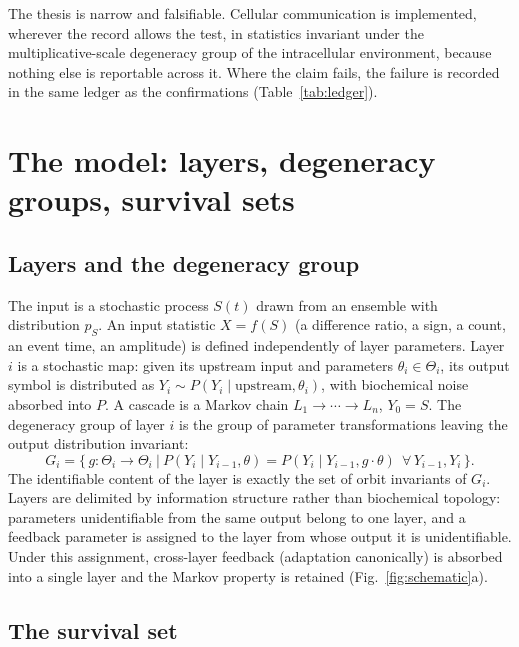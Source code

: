 \documentclass[11pt,a4paper]{article}
\begin{document}
The thesis is narrow and falsifiable. Cellular communication is implemented, wherever the record allows the test, in statistics invariant under the multiplicative-scale degeneracy group of the intracellular environment, because nothing else is reportable across it. Where the claim fails, the failure is recorded in the same ledger as the confirmations (Table~\ref{tab:ledger}).

\section{The model: layers, degeneracy groups, survival sets}
\label{sec:model}

\subsection{Layers and the degeneracy group}

The input is a stochastic process $S(t)$ drawn from an ensemble with distribution $p_S$. An input statistic $X=f(S)$ (a difference ratio, a sign, a count, an event time, an amplitude) is defined independently of layer parameters. Layer $i$ is a stochastic map: given its upstream input and parameters $\theta_i\in\Theta_i$, its output symbol is distributed as $Y_i\sim P(Y_i\mid\text{upstream},\theta_i)$, with biochemical noise absorbed into $P$. A cascade is a Markov chain $L_1\to\cdots\to L_n$, $Y_0=S$. The degeneracy group of layer $i$ is the group of parameter transformations leaving the output distribution invariant:
\begin{equation}
G_i=\Big\{\,g:\Theta_i\to\Theta_i\ \Big|\ P(Y_i\mid Y_{i-1},\theta)=P(Y_i\mid Y_{i-1},g\cdot\theta)\ \ \forall\,Y_{i-1},Y_i\,\Big\}.
\label{eq:group}
\end{equation}
The identifiable content of the layer is exactly the set of orbit invariants of $G_i$. Layers are delimited by information structure rather than biochemical topology: parameters unidentifiable from the same output belong to one layer, and a feedback parameter is assigned to the layer from whose output it is unidentifiable. Under this assignment, cross-layer feedback (adaptation canonically) is absorbed into a single layer and the Markov property is retained (Fig.~\ref{fig:schematic}a).

\subsection{The survival set}
\end{document}
